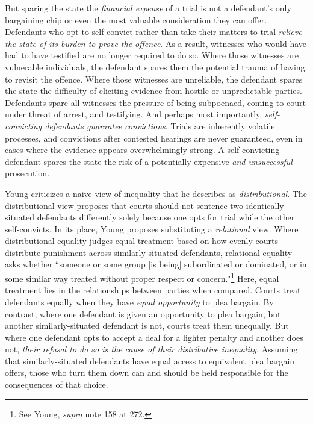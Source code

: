 But sparing the state the \textit{financial expense} of a trial is not a defendant's only bargaining chip or even the most valuable consideration they can offer. Defendants who opt to self-convict rather than take their matters to trial \textit{relieve the state of its burden to prove the offence}. As a result, witnesses who would have had to have testified are no longer required to do so. Where those witnesses are vulnerable individuals, the defendant spares them the potential trauma of having to revisit the offence. Where those witnesses are unreliable, the defendant spares the state the difficulty of eliciting evidence from hostile or unpredictable parties. Defendants spare all witnesses the pressure of being subpoenaed, coming to court under threat of arrest, and testifying. And perhaps most importantly, \textit{self-convicting defendants guarantee convictions}. Trials are inherently volatile processes, and convictions after contested hearings are never guaranteed, even in cases where the evidence appears overwhelmingly strong. A self-convicting defendant spares the state the risk of a potentially expensive \textit{and unsuccessful} prosecution.

Young criticizes a naive view of inequality that he describes as \textit{distributional}. The distributional view proposes that courts should not sentence two identically situated defendants differently solely because one opts for trial while the other self-convicts. In its place, Young proposes substituting a \textit{relational} view. Where distributional equality judges equal treatment based on how evenly courts distribute punishment across similarly situated defendants, relational equality asks whether ``someone or some group [is being] subordinated or dominated, or in some similar way treated without proper respect or concern."\footnote{See Young, \textit{supra} note 158 at 272.} Here, equal treatment lies in the relationships between parties when compared. Courts treat defendants equally when they have \textit{equal opportunity} to plea bargain. By contrast, where one defendant is given an opportunity to plea bargain, but another similarly-situated defendant is not, courts treat them unequally. But where one defendant opts to accept a deal for a lighter penalty and another does not, \textit{their refusal to do so is the cause of their distributive inequality}. Assuming that similarly-situated defendants have equal access to equivalent plea bargain offers, those who turn them down can and should be held responsible for the consequences of that choice.

